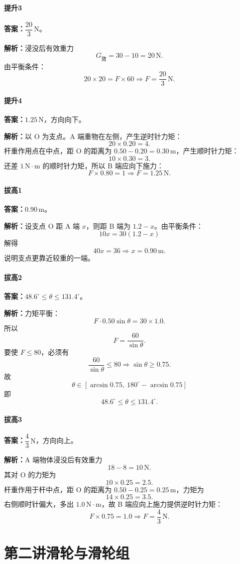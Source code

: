 \documentclass[12pt,a4paper]{ctexart}
\newcommand{\Ans}[1]{\par\noindent\textbf{答案：}#1\par}
\newcommand{\Sol}[1]{\par\noindent\textbf{解析：}#1\par}
\begin{document}
\paragraph{提升3}
\Ans{$\dfrac{20}{3}\,\mathrm{N}$。}
\Sol{浸没后有效重力
\[
G_{\text{效}}=30-10=20\,\mathrm{N}.
\]
由平衡条件：
\[
20\times 20 = F\times 60
\Rightarrow F=\frac{20}{3}\,\mathrm{N}.
\]}

\paragraph{提升4}
\Ans{$1.25\,\mathrm{N}$，方向向下。}
\Sol{以 O 为支点。A 端重物在左侧，产生逆时针力矩：
\[
20\times 0.20 = 4.
\]
杆重作用点在中点，距 O 的距离为 $0.50-0.20=0.30\,\mathrm{m}$，产生顺时针力矩：
\[
10\times 0.30=3.
\]
还差 $1\,\mathrm{N\cdot m}$ 的顺时针力矩，所以 B 端应向下施力：
\[
F\times 0.80=1 \Rightarrow F=1.25\,\mathrm{N}.
\]}

\paragraph{拔高1}
\Ans{$0.90\,\mathrm{m}$。}
\Sol{设支点 O 距 A 端 $x$，则距 B 端为 $1.2-x$。由平衡条件：
\[
10x = 30(1.2-x)
\]
解得
\[
40x=36 \Rightarrow x=0.90\,\mathrm{m}.
\]
说明支点更靠近较重的一端。}

\paragraph{拔高2}
\Ans{$48.6^\circ \le \theta \le 131.4^\circ$。}
\Sol{力矩平衡：
\[
F\cdot 0.50\sin\theta = 30\times 1.0.
\]
所以
\[
F=\frac{60}{\sin\theta}.
\]
要使 $F\le 80$，必须有
\[
\frac{60}{\sin\theta}\le 80 \Rightarrow \sin\theta\ge 0.75.
\]
故
\[
\theta\in [\arcsin 0.75,\ 180^\circ-\arcsin 0.75]
\]
即
\[
48.6^\circ \le \theta \le 131.4^\circ.
\]}

\paragraph{拔高3}
\Ans{$\dfrac{4}{3}\,\mathrm{N}$，方向向上。}
\Sol{A 端物体浸没后有效重力
\[
18-8=10\,\mathrm{N}.
\]
其对 O 的力矩为
\[
10\times 0.25=2.5.
\]
杆重作用于杆中点，距 O 的距离为 $0.50-0.25=0.25\,\mathrm{m}$，力矩为
\[
14\times 0.25=3.5.
\]
右侧顺时针偏大，多出 $1.0\,\mathrm{N\cdot m}$，故 B 端应向上施力提供逆时针力矩：
\[
F\times 0.75=1.0 \Rightarrow F=\frac{4}{3}\,\mathrm{N}.
\]}

\clearpage
\section{第二讲\texorpdfstring{\quad}{ }滑轮与滑轮组}
\end{document}

